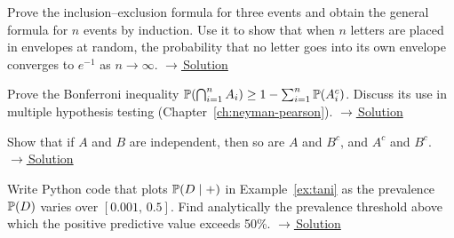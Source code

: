 \documentclass[main.tex]{subfiles}
\begin{document}
\begin{exercise}\label{exr:01-2}
Prove the inclusion--exclusion formula for three events and obtain the general formula for $n$ events by induction. Use it to show that when $n$ letters are placed in envelopes at random, the probability that no letter goes into its own envelope converges to $e^{-1}$ as $n\to\infty$.
\hfill\hyperref[coz:01-2]{\footnotesize$\rightarrow$\,Solution}
\end{exercise}

\begin{exercise}\label{exr:01-3}
Prove the Bonferroni inequality $\P(\bigcap_{i=1}^n A_i)\ge 1-\sum_{i=1}^n \P(A_i^c)$. Discuss its use in multiple hypothesis testing (Chapter~\ref{ch:neyman-pearson}).
\hfill\hyperref[coz:01-3]{\footnotesize$\rightarrow$\,Solution}
\end{exercise}

\begin{exercise}\label{exr:01-4}
Show that if $A$ and $B$ are independent, then so are $A$ and $B^c$, and $A^c$ and $B^c$.
\hfill\hyperref[coz:01-4]{\footnotesize$\rightarrow$\,Solution}
\end{exercise}

\begin{exercise}\label{exr:01-5}
Write Python code that plots $\P(D\mid+)$ in Example~\ref{ex:tani} as the prevalence $\P(D)$ varies over $[0.001,\,0.5]$. Find analytically the prevalence threshold above which the positive predictive value exceeds 50\%.
\hfill\hyperref[coz:01-5]{\footnotesize$\rightarrow$\,Solution}
\end{exercise}

\end{document}
